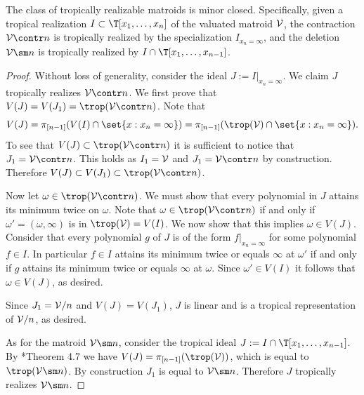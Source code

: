 \begin{theorem}\label{thm:minorClosed}
The class of tropically realizable matroids is minor closed. Specifically, given a tropical realization $I\subset \T[x_1,\dots,x_n]$ of the valuated matroid $\mathcal{V}$, the contraction $\sV\contr n$ is tropically realized by the specialization $I_{x_n=\infty}$, and the deletion $\sV\sm n$ is tropically realized by $I\cap\T[x_1,\dots,x_{n-1}]$.
\end{theorem}
\begin{proof}
Without loss of generality, consider the ideal $J:= I|_{x_n=\infty}$. We claim $J$ tropically realizes $\sV\contr n$. We first prove that $V(J) = V(J_1)=\trop(\sV\contr n)$. Note that
$$V(J)= \pi_{[n-1]}(V(I)\cap \set{x: x_n = \infty}) = \pi_{[n-1]}(\trop(\sV)\cap\set{x: x_n=\infty}).$$
To see that $V(J)\subset \trop(\sV\contr n)$ it is sufficient to notice that $J_1 = \sV\contr n$. This holds as $I_1=\mathcal{V}$ and $J_1=\sV\contr n$ by construction. Therefore $V(J)\subset V(J_1)\subset \trop(\sV\contr n)$. 

Now let $\omega\in \trop(\sV\contr n)$. We must show that every polynomial in $J$ attains its minimum twice on $\omega$. Note that $\omega\in \trop(\sV\contr n)$ if and only if $\omega'=(\omega,\infty)$ is in $\trop(\sV)=V(I)$. We now show that this implies $\omega\in V(J)$. Consider that every polynomial $g$ of $J$ is of the form $f|_{x_n=\infty}$ for some polynomial $f\in I$. In particular $f\in I$ attains its minimum twice or equals $\infty$ at $\omega'$ if and only if $g$ attains its minimum twice or equals $\infty$ at $\omega$. Since $\omega'\in V(I)$ it follows that $\omega\in V(J)$, as desired. 

Since $J_1=\mathcal{V}/n$ and $V(J)=V(J_1)$, $J$ is linear and is a tropical representation of $\mathcal{V}/n$, as desired.

As for the matroid $\sV\sm n$, consider the tropical ideal $J := I\cap \T[x_1,\dots,x_{n-1}]$. By \cite{MR20}*{Theorem 4.7} we have $V(J)=\pi_{[n-1]}(\trop(\sV))$, which is equal to $\trop(\sV\sm n)$. By construction $J_1$ is equal to $\sV\sm n$. Therefore $J$ tropically realizes $\sV\sm n$.
\end{proof}


